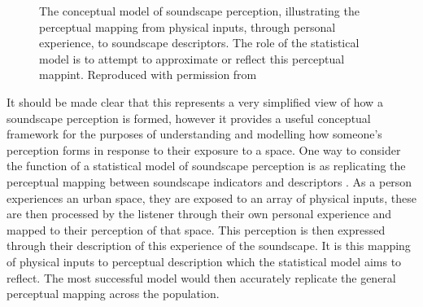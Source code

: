 \documentclass[
  authoryear,
  preprint,
  1p]{elsarticle}
\begin{document}
\begin{figure}


\caption{\label{fig-model}The conceptual model of soundscape perception,
illustrating the perceptual mapping from physical inputs, through
personal experience, to soundscape descriptors. The role of the
statistical model is to attempt to approximate or reflect this
perceptual mappint. Reproduced with permission from
\citet{Mitchell2022Predictive}}

\end{figure}%

It should be made clear that this represents a very simplified view of
how a soundscape perception is formed, however it provides a useful
conceptual framework for the purposes of understanding and modelling how
someone's perception forms in response to their exposure to a space. One
way to consider the function of a statistical model of soundscape
perception is as replicating the perceptual mapping between soundscape
indicators and descriptors \citep{Lionello2021new}. As a person
experiences an urban space, they are exposed to an array of physical
inputs, these are then processed by the listener through their own
personal experience and mapped to their perception of that space. This
perception is then expressed through their description of this
experience of the soundscape. It is this mapping of physical inputs to
perceptual description which the statistical model aims to reflect. The
most successful model would then accurately replicate the general
perceptual mapping across the population.
\end{document}
